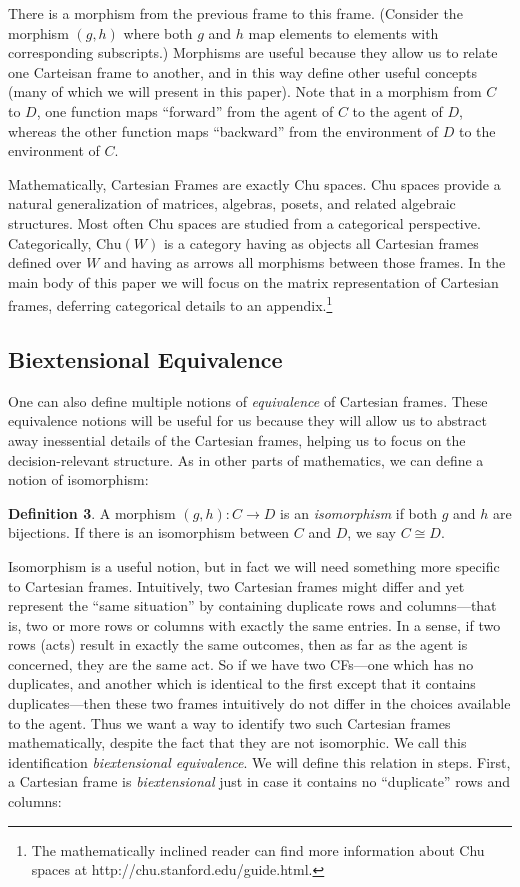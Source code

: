 \documentclass{article}
\begin{document}
\noindent There is a morphism from the previous frame to this frame. (Consider the morphism $(g, h)$ where both $g$ and $h$ map elements to elements with corresponding subscripts.)  Morphisms are useful because they allow us to relate one Carteisan frame to another, and in this way define other useful concepts (many of which we will present in this paper). Note that in a morphism from $C$ to $D$, one function maps ``forward'' from the agent of $C$ to the agent of $D$, whereas the other function maps ``backward'' from the environment of $D$ to the environment of $C$.

Mathematically, Cartesian Frames are exactly Chu spaces.
Chu spaces provide a natural generalization of matrices, algebras, posets, and related algebraic structures.
Most often Chu spaces are studied from a categorical perspective.
Categorically, $\text{Chu}(W)$ is a category having as objects all Cartesian frames defined over $W$ and having as arrows all morphisms between those frames.
In the main body of this paper we will focus on the matrix representation of Cartesian frames, deferring categorical details to an appendix.\footnote{The mathematically inclined reader can find more information about Chu spaces at http://chu.stanford.edu/guide.html.}

\subsection{Biextensional Equivalence}
\label{bi}

One can also define multiple notions of \emph{equivalence} of Cartesian frames. These equivalence notions will be useful for us because they will allow us to abstract away inessential details of the Cartesian frames, helping us to focus on the decision-relevant structure. 
As in other parts of mathematics, we can define a notion of isomorphism:

\bigskip
\noindent \textbf{Definition 3}.
A morphism $(g, h) : C \to D$ is an \emph{isomorphism} if both $g$ and $h$ are bijections.
If there is an isomorphism between $C$ and $D$, we say $C \cong D$.


\bigskip
\noindent Isomorphism is a useful notion, but in fact we will need something more specific to Cartesian frames.
Intuitively, two Cartesian frames might differ and yet represent the ``same situation'' by containing duplicate rows and columns---that is, two or more rows or columns with exactly the same entries.
In a sense, if two rows (acts) result in exactly the same outcomes, then as far as the agent is concerned, they are the same act.
So if we have two CFs---one which has no duplicates, and another which is identical to the first except that it contains duplicates---then these two frames intuitively do not differ in the choices available to the agent.
Thus we want a way to identify two such Cartesian frames mathematically, despite the fact that they are not isomorphic.
We call this identification \emph{biextensional equivalence}.
We will define this relation in steps.
First, a Cartesian frame is \emph{biextensional} just in case it contains no ``duplicate'' rows and columns:
\end{document}
